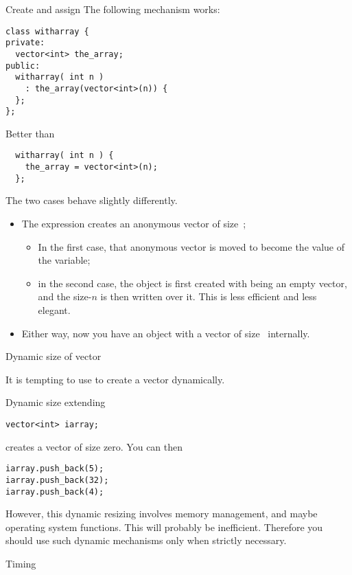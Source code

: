\begin{block}{Create and assign}
  \label{sl:class-has-vector}
  The following mechanism works:
\begin{lstlisting}
class witharray {
private:
  vector<int> the_array;
public:
  witharray( int n )
    : the_array(vector<int>(n)) {
  };
};
\end{lstlisting}
Better than
\begin{lstlisting}
  witharray( int n ) {
    the_array = vector<int>(n);
  };
\end{lstlisting}
\end{block}

The two cases behave slightly differently.
\begin{itemize}
\item The expression  creates an anonymous vector
  of size~;
  \begin{itemize}
  \item In the first case, that anonymous vector is moved to become
    the value of the  variable;
  \item in the second case, the object is first created with
     being an empty
    vector, and the size-$n$ is then written over it. This is less
    efficient and less elegant.
  \end{itemize}
\item Either way, now you have an object with a vector of size~ internally.
\end{itemize}

 {Dynamic size of vector}

It is tempting to use  to create a vector dynamically.

\begin{block}{Dynamic size extending}
  \label{sl:vector-extend}
\begin{lstlisting}
vector<int> iarray;
\end{lstlisting}
creates a vector of size zero. You can then
\begin{lstlisting}
iarray.push_back(5);
iarray.push_back(32);
iarray.push_back(4);
\end{lstlisting}
\end{block}

However, this dynamic resizing involves memory management, and maybe
operating system functions. This will probably be
inefficient. Therefore you should use such dynamic mechanisms only
when strictly necessary.

 {Timing}

